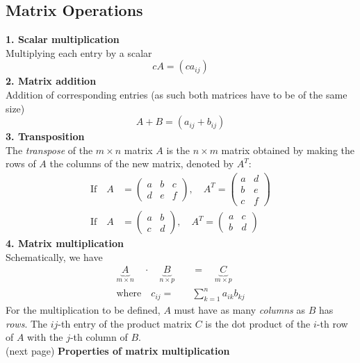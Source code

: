 \documentclass{report}
\begin{document}
\subsection{Matrix Operations}
\textbf{1. Scalar multiplication}\\
Multiplying each entry by a scalar
\begin{equation*}
cA=(ca_{ij})
\end{equation*}
\textbf{2. Matrix addition}\\
Addition of corresponding entries (as such both matrices have to be of the same size)
\begin{equation*}
A+B=(a_{ij}+b_{ij})
\end{equation*}
\textbf{3. Transposition}\\
The \textit{transpose} of the $m\times n$ matrix $A$ is the $n\times m$ matrix 
obtained by making the rows of $A$ the columns of the new matrix, denoted by $A^T$:
\begin{align*}
\text{If}\quad A&=
\begin{pmatrix}
a&b&c\\
d&e&f
\end{pmatrix}
,\quad A^T=
\begin{pmatrix}
a&d\\
b&e\\
c&f
\end{pmatrix}\\
\text{If}\quad A&=
\begin{pmatrix}
a&b\\
c&d
\end{pmatrix}
,\quad A^T=
\begin{pmatrix}
a&c\\
b&d
\end{pmatrix}
\end{align*}
\textbf{4. Matrix multiplication}\\
Schematically, we have
\begin{align*}
\underbrace{A}_{m\times n}\quad\cdot\quad\underbrace{B}_{n\times p}\quad
&=\quad\underbrace{C}_{m\times p}\\
\text{where}\quad c_{ij}=&\sum_{k=1}^na_{ik}b_{kj}
\end{align*}
For the multiplication to be defined, $A$ must have as many \textit{columns} as $B$ has \textit{rows}.
The $ij$-th entry of the product matrix $C$ is the dot product of the $i$-th row of $A$
with the $j$-th column of $B$.\\
(next page)
\newpage
\noindent\textbf{Properties of matrix multiplication}
\end{document}
